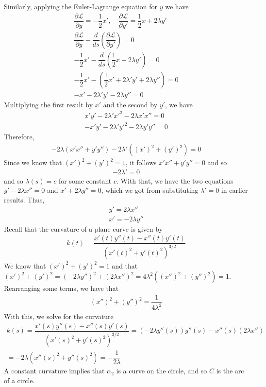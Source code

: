\documentclass{article}
\begin{document}
	Similarly, applying the Euler-Lagrange equation for $y$ we have
	\begin{gather*}
		\dfrac{\partial \mathcal{L}}{\partial y} = - \dfrac{1}{2} x', \quad
		\dfrac{\partial \mathcal{L}}{\partial y'} = \dfrac{1}{2} x + 2 \lambda y' \\
		\dfrac{\partial \mathcal{L}}{\partial y} - \dfrac{d}{ds} \left( \dfrac{\partial \mathcal{L}}{\partial y'} \right) = 0 \\
		-\dfrac{1}{2} x' - \dfrac{d}{ds} \left( \dfrac{1}{2} x + 2 \lambda y' \right) = 0 \\
		-\dfrac{1}{2} x' - \left( \dfrac{1}{2} x' + 2 \lambda' y' + 2 \lambda y'' \right) = 0 \\
		-x' - 2 \lambda' y' - 2 \lambda y'' = 0
	\end{gather*}
	Multiplying the first result by $x'$ and the second by $y'$, we have
	\begin{gather*}
		x' y' - 2 \lambda' x'^2 - 2 \lambda x' x'' = 0 \\
		-x' y' - 2 \lambda' y'^2 - 2 \lambda y' y'' = 0
	\end{gather*}
	Therefore,
	\begin{gather*}
		-2 \lambda \left( x' x'' + y' y'' \right) - 2 \lambda' \left( \left( x' \right)^2 + \left( y' \right)^2 \right) = 0
	\end{gather*}
	Since we know that $\left( x' \right)^2 + \left( y' \right)^2 = 1$, it follows $x' x'' + y' y'' = 0$ and so
	\begin{gather*}
		-2 \lambda' = 0
	\end{gather*}
	and so $\lambda(s) = c$ for some constant $c$. With that, we have the two equations $y' - 2 \lambda x'' = 0$ and $x' + 2 \lambda y'' = 0$, which we got from substituting $\lambda' = 0$ in earlier results. Thus,
	\begin{gather*}
		y' = 2 \lambda x'' \\
		x' = - 2 \lambda y''
	\end{gather*}
	Recall that the curvature of a plane curve is given by
	\begin{gather*}
		k(t) = \dfrac{x'(t) y''(t) - x''(t) y'(t)}{ \left( x'(t)^2 + y'(t)^2 \right)^{3/2} }
	\end{gather*}
	We know that $\left( x' \right)^2 + \left( y' \right)^2 = 1$ and that $\left( x' \right)^2 + \left( y' \right)^2 = \left( - 2 \lambda y'' \right)^2 + \left( 2 \lambda x'' \right)^2 = 4 \lambda^2 \left( \left( x'' \right)^2 + \left( y'' \right)^2 \right) = 1$. Rearranging some terms, we have that
	\begin{gather*}
		\left( x'' \right)^2 + \left( y'' \right)^2 = \dfrac{1}{ 4 \lambda^2 }
	\end{gather*}
	With this, we solve for the curvature
	\begin{gather*}
		k(s) = \dfrac{x'(s) y''(s) - x''(s) y'(s)}{ \left( x'(s)^2 + y'(s)^2 \right)^{3/2} } = \left( - 2 \lambda y''(s) \right)  y''(s) - x''(s) \left( 2 \lambda x'' \right) \\
		= -2 \lambda \left( x''(s)^2 + y''(s)^2 \right) = -\dfrac{1}{2 \lambda}
	\end{gather*}
	A constant curvature implies that $\alpha_2$ is a curve on the circle, and so $C$ is the arc of a circle.
\end{document}
